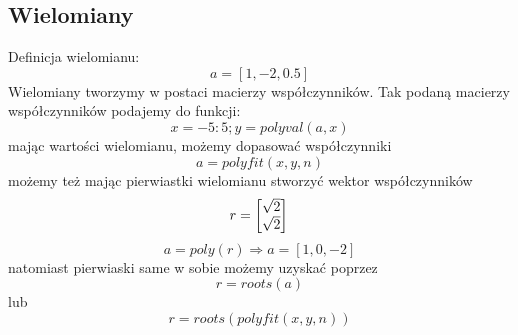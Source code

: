 \documentclass[16pt]{article}
\begin{document}
        \subsection*{Wielomiany}
            Definicja wielomianu:
                \begin{equation*}
                    a= [1, -2, 0.5]
                \end{equation*}
            Wielomiany tworzymy w postaci macierzy współczynników.
            Tak podaną macierzy współczynników podajemy do funkcji:
            \begin{equation*}
                x= -5:5;
                y= polyval(a, x)
            \end{equation*}
            mając wartości wielomianu, możemy dopasować współczynniki
            \begin{equation*}
                a= polyfit(x, y, n)
            \end{equation*}
            możemy też mając pierwiastki wielomianu stworzyć wektor współczynników
            \begin{equation*}
                r= 
                \begin{bmatrix}
                   \sqrt{2}\\ 
                   \sqrt{2}\\ 
                \end{bmatrix}\\
            \end{equation*}
            \begin{equation*}
                a= poly(r) \Rightarrow a= [1, 0, -2]
            \end{equation*}
            natomiast pierwiaski same w sobie możemy uzyskać poprzez
            \begin{equation*}
                r= roots(a)
            \end{equation*}
            lub
            \begin{equation*}
                r= roots(polyfit(x, y, n))
            \end{equation*}
\end{document}
